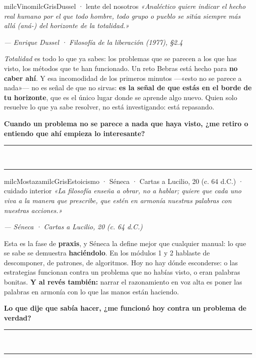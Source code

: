 \documentclass[11pt,letterpaper]{article}
\newcommand{\linead}[1]{\noindent\color{milcLinea}\rule{#1}{0.5pt}\color{milcNegro}}
\begin{document}
\begin{softbox}{milcVino}{milcGris}{Dussel · lente del nosotros}
\textit{«Analéctico quiere indicar el hecho real humano por el que todo hombre, todo grupo o pueblo se sitúa siempre más allá (aná-) del horizonte de la totalidad.»}

{\footnotesize\itshape\color{milcNegro!70}--- Enrique Dussel · Filosofía de la liberación (1977), §2.4}

\emph{Totalidad} es todo lo que ya sabes: los problemas que se parecen a los que has visto, los métodos que te han funcionado. Un reto Bebras está hecho para \textbf{no caber ahí}. Y esa incomodidad de los primeros minutos ---«esto no se parece a nada»--- no es señal de que no sirvas: \textbf{es la señal de que estás en el borde de tu horizonte}, que es el único lugar donde se aprende algo nuevo. Quien solo resuelve lo que ya sabe resolver, no está investigando: está repasando.

\textbf{Cuando un problema no se parece a nada que haya visto, ¿me retiro o entiendo que ahí empieza lo interesante?}
\end{softbox}
\linead{\linewidth}\\[1mm]
\linead{\linewidth}

\begin{softbox}{milcMostaza}{milcGris}{Estoicismo · Séneca · Cartas a Lucilio, 20 (c. 64 d.C.) · cuidado interior}
\textit{«La filosofía enseña a obrar, no a hablar; quiere que cada uno viva a la manera que prescribe, que estén en armonía nuestras palabras con nuestras acciones.»}

{\footnotesize\itshape\color{milcNegro!70}--- Séneca · Cartas a Lucilio, 20 (c. 64 d.C.)}

Esta es la fase de \textbf{praxis}, y Séneca la define mejor que cualquier manual: lo que se sabe se demuestra \textbf{haciéndolo}. En los módulos 1 y 2 hablaste de descomponer, de patrones, de algoritmos. Hoy no hay dónde esconderse: o las estrategias funcionan contra un problema que no habías visto, o eran palabras bonitas. \textbf{Y al revés también:} narrar el razonamiento en voz alta es poner las palabras en armonía con lo que las manos están haciendo.

\textbf{Lo que dije que sabía hacer, ¿me funcionó hoy contra un problema de verdad?}
\end{softbox}
\linead{\linewidth}\\[1mm]
\linead{\linewidth}
\end{document}
